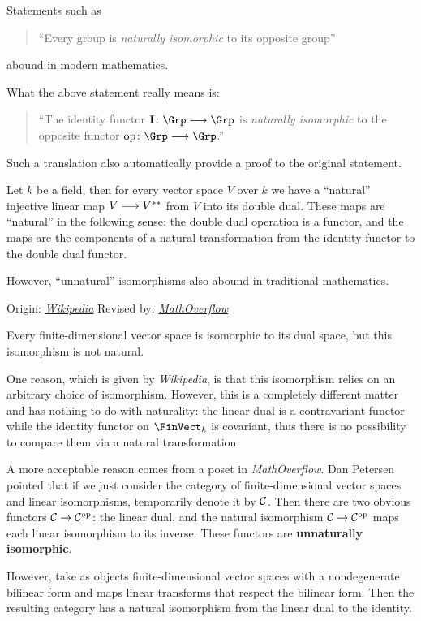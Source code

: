   \begin{exam}
    Statements such as
    \begin{quote}
      ``Every group is \emph{naturally isomorphic} to its opposite group''
    \end{quote}
    abound in modern mathematics.

    What the above statement really means is:
    \begin{quote}
      ``The identity functor $\Id \colon \Grp \To \Grp$ is \emph{naturally isomorphic} to the opposite functor $\op \colon \Grp \To \Grp$.''
    \end{quote}

    Such a translation also automatically provide a proof to the original statement.
  \end{exam}

  \begin{exam}
    Let $k$ be a field, then for every vector space $V$ over $k$ we have a ``natural'' injective linear map $V \longrightarrow V^{\ast\ast}$ from $V$ into its double dual. These maps are ``natural'' in the following sense: the double dual operation is a functor, and the maps are the components of a natural transformation from the identity functor to the double dual functor.
  \end{exam}

  However, ``unnatural'' isomorphisms also abound in traditional mathematics.
  \begin{exam}
  Origin:
  \href{http://en.wikipedia.org/wiki/Natural_transformation#Example:_dual_of_a_finite-dimensional_vector_space}{\emph{Wikipedia}}
  Revised by:
  \href{http://mathoverflow.net/a/139398/43771}{\emph{MathOverflow}}

   Every finite-dimensional vector space is isomorphic to its dual space, but this isomorphism is not natural.

   One reason, which is given by \emph{Wikipedia}, is that this isomorphism relies on an arbitrary choice of isomorphism. However, this is a completely different matter and has nothing to do with naturality: the linear dual is a contravariant functor while the identity functor on $\FinVect_{k}$ is covariant, thus there is no possibility to compare them via a natural transformation.

   A more acceptable reason comes from a poset in \emph{MathOverflow}. Dan Petersen pointed that if we just consider the category of finite-dimensional vector spaces and linear isomorphisms, temporarily denote it by ${\cal C}$. Then there are two obvious functors ${\cal C}\to{\cal C}^{\operatorname{op}}$: the linear dual, and the natural isomorphism ${\cal C}\to{\cal C}^{\operatorname{op}}$ maps each linear isomorphism to its inverse. These functors are \textbf{unnaturally isomorphic}.

   However, take as objects finite-dimensional vector spaces with a nondegenerate bilinear form and maps linear transforms that respect the bilinear form. Then the resulting category has a natural isomorphism from the linear dual to the identity.
  \end{exam}

